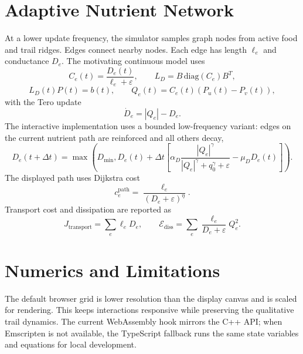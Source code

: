 \documentclass[11pt]{article}
\begin{document}
\section{Adaptive Nutrient Network}
At a lower update frequency, the simulator samples graph nodes from active
food and trail ridges. Edges connect nearby nodes. Each edge has length
$\ell_e$ and conductance $D_e$. The motivating continuous model uses
\[
C_e(t)=\frac{D_e(t)}{\ell_e+\varepsilon},\qquad
L_D=B\,\mathrm{diag}(C_e)B^T,
\]
\[
L_D(t)P(t)=b(t),\qquad
Q_e(t)=C_e(t)(P_u(t)-P_v(t)),
\]
with the Tero update
\[
\dot D_e=|Q_e|-D_e.
\]
The interactive implementation uses a bounded low-frequency variant: edges on
the current nutrient path are reinforced and all others decay,
\[
D_e(t+\Delta t)=\max\left(D_{\min},
D_e(t)+\Delta t\left[
\alpha_D\frac{|Q_e|^\gamma}{|Q_e|^\gamma+q_0^\gamma+\varepsilon}
-\mu_DD_e(t)
\right]\right).
\]
The displayed path uses Dijkstra cost
\[
c_e^{\mathrm{path}}=\frac{\ell_e}{(D_e+\varepsilon)^\eta}.
\]
Transport cost and dissipation are reported as
\[
J_{\mathrm{transport}}=\sum_e \ell_eD_e,\qquad
\mathcal E_{\mathrm{diss}}=\sum_e \frac{\ell_e}{D_e+\varepsilon}Q_e^2.
\]

\section{Numerics and Limitations}
The default browser grid is lower resolution than the display canvas and is
scaled for rendering. This keeps interactions responsive while preserving the
qualitative trail dynamics. The current WebAssembly hook mirrors the C++ API;
when Emscripten is not available, the TypeScript fallback runs the same
state variables and equations for local development.



\end{document}
